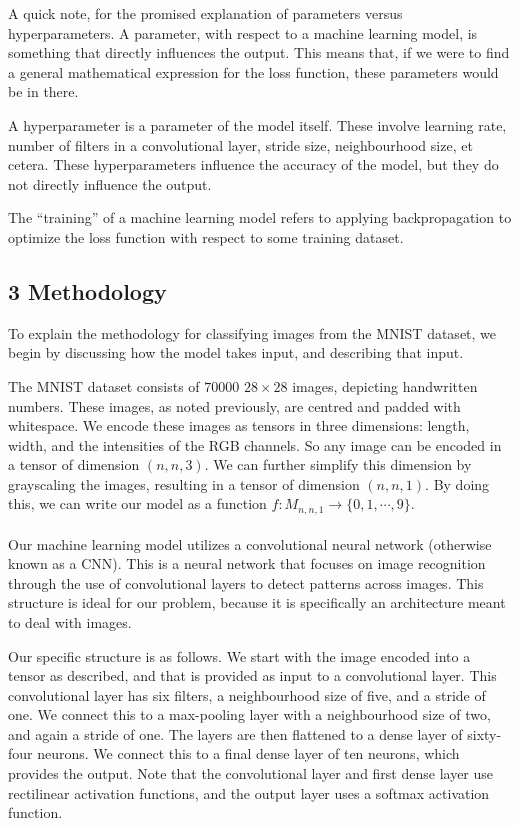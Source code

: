 \documentclass{article}
\begin{document}
A quick note, for the promised explanation of parameters versus hyperparameters. A parameter, with respect to a machine learning model, is something that directly influences the output. This means that, if we were to find a general mathematical expression for the loss function, these parameters would be in there.

A hyperparameter is a parameter of the model itself. These involve learning rate, number of filters in a convolutional layer, stride size, neighbourhood size, et cetera. These hyperparameters influence the accuracy of the model, but they do not directly influence the output.

The ``training'' of a machine learning model refers to applying backpropagation to optimize the loss function with respect to some training dataset.

\subsection*{3 Methodology}
To explain the methodology for classifying images from the MNIST dataset, we begin by discussing how the model takes input, and describing that input. 

The MNIST dataset consists of $70000$ $28\times 28$ images, depicting handwritten numbers. These images, as noted previously, are centred and padded with whitespace. We encode these images as tensors in three dimensions: length, width, and the intensities of the RGB channels. So any image can be encoded in a tensor of dimension $(n, n, 3)$. We can further simplify this dimension by grayscaling the images, resulting in a tensor of dimension $(n, n, 1)$. By doing this, we can write our model as a function $f: M_{n,n,1} \rightarrow  \{0,1,\cdots,9\}$.\\\\

Our machine learning model utilizes a convolutional neural network (otherwise known as a CNN). This is a neural network that focuses on image recognition through the use of convolutional layers to detect patterns across images. This structure is ideal for our problem, because it is specifically an architecture meant to deal with images.

Our specific structure is as follows. We start with the image encoded into a tensor as described, and that is provided as input to a convolutional layer. This convolutional layer has six filters, a neighbourhood size of five, and a stride of one. We connect this to a max-pooling layer with a neighbourhood size of two, and again a stride of one. The layers are then flattened to a dense layer of sixty-four neurons. We connect this to a final dense layer of ten neurons, which provides the output. Note that the convolutional layer and first dense layer use rectilinear activation functions, and the output layer uses a softmax activation function.
\end{document}
